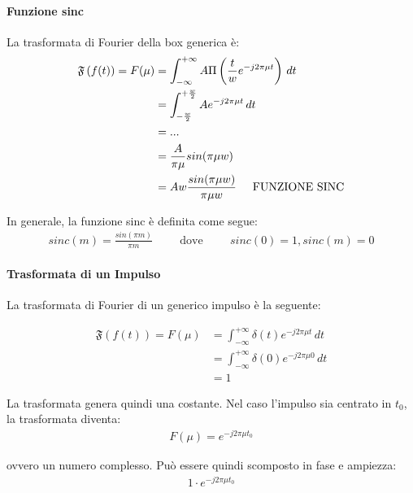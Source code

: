 \documentclass[a4paper, 10pt]{report}
\begin{document}
\paragraph*{Funzione sinc}
La trasformata di Fourier della box generica è:\\
\begin{align*}
\mathfrak{F}\left(f(t)\right) = F(\mu) &= \int^{+\infty}_{-\infty}A\Pi \left(\frac{t}{w}e^{-j 2 \pi \mu t}\right) \, dt \\
&= \int^{+\frac{w}{2}}_{-\frac{w}{2}} A e^{-j 2 \pi \mu t} \, dt \\
& = ... \\
&= \frac{A}{\pi \mu} sin(\pi \mu w) \\
&= Aw \frac{sin(\pi \mu w)}{\pi \mu w} \hspace{0.5cm}\text{FUNZIONE SINC}
\end{align*}

\noindent In generale, la funzione sinc è definita come segue:
\begin{align*}
sinc(m) = \frac{sin(\pi m)}{\pi m} \hspace{1cm}\text{dove}\hspace{1cm} sinc(0) = 1, sinc(m) = 0
\end{align*}

\paragraph*{Trasformata di un Impulso} La trasformata di Fourier di un generico impulso è la seguente:

\begin{align*}
\mathfrak{F}(f(t)) = F(\mu) &= \int^{+\infty}_{-\infty} \delta(t) e^{-j2 \pi \mu t} \, dt\\
&= \int^{+\infty}_{-\infty} \delta(0) e^{-j2 \pi \mu 0} \, dt\\
&= 1
\end{align*}

\noindent La trasformata genera quindi una costante. Nel caso l'impulso sia centrato in $t_0$, la trasformata diventa:
\begin{align*}
F(\mu) = e^{-j2 \pi \mu t_0}
\end{align*}

\noindent ovvero un numero complesso. Può essere quindi scomposto in fase e ampiezza:
\begin{align*}
1 \cdot e^{-j2 \pi \mu t_0}
\end{align*}
\end{document}
